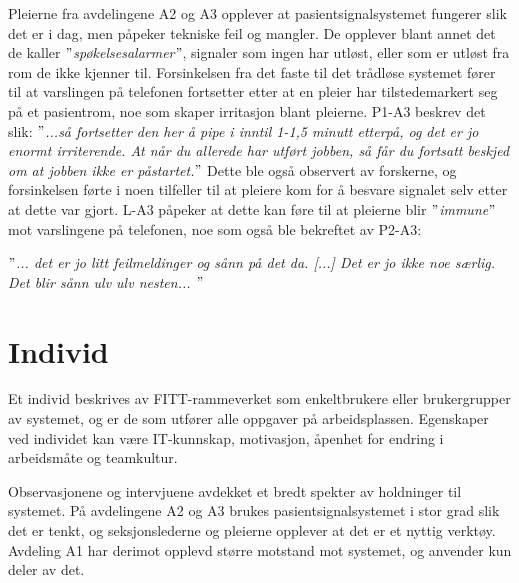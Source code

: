 \noindent
Pleierne fra avdelingene A2 og A3 opplever at pasientsignalsystemet fungerer slik det er i dag, men påpeker tekniske feil og mangler. De opplever blant annet det de kaller \textit{$"$spøkelsesalarmer$"$}, signaler som ingen har utløst, eller som er utløst fra rom de ikke kjenner til. Forsinkelsen fra det faste til det trådløse systemet fører til at varslingen på telefonen fortsetter etter at en pleier har tilstedemarkert seg på et pasientrom, noe som skaper irritasjon blant pleierne. P1-A3 beskrev det slik: \textit{$"$...så fortsetter den her å pipe i inntil 1-1,5 minutt etterpå, og det er jo enormt irriterende. At når du allerede har utført jobben, så får du fortsatt beskjed om at jobben ikke er påstartet.$"$} Dette ble også observert av forskerne, og forsinkelsen førte i noen tilfeller til at pleiere kom for å besvare signalet selv etter at dette var gjort. L-A3 påpeker at dette kan føre til at pleierne blir \textit{$"$immune$"$} mot varslingene på telefonen, noe som også ble bekreftet av P2-A3:

\noindent
\textit{$"$... det er jo litt feilmeldinger og sånn på det da. [...] Det er jo ikke noe særlig. Det blir sånn ulv ulv nesten... $"$}

\section{Individ}
Et individ beskrives av FITT-rammeverket som enkeltbrukere eller brukergrupper av systemet, og er de som utfører alle oppgaver på arbeidsplassen. Egenskaper ved individet kan være IT-kunnskap, motivasjon, åpenhet for endring i arbeidsmåte og teamkultur.

\noindent
Observasjonene og intervjuene avdekket et bredt spekter av holdninger til systemet. På avdelingene A2 og A3 brukes pasientsignalsystemet i stor grad slik det er tenkt, og seksjonslederne og pleierne opplever at det er et nyttig verktøy. Avdeling A1 har derimot opplevd større motstand mot systemet, og anvender kun deler av det.

